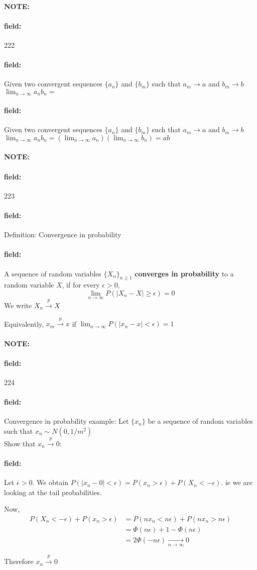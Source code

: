 \documentclass[12pt]{article}
\newenvironment{note}{\paragraph{NOTE:}}{}
\newenvironment{field}{\paragraph{field:}}{}
\begin{document}
\begin{note} \begin{field} \tiny 222 \end{field}
  \begin{field}
    Given two convergent sequences $\{a_n\}$ and $\{b_m\}$ such that $a_m \to a$ and $b_m \to b$\\
    $\lim_{n \to \infty} a_nb_n = $
  \end{field}
  \begin{field}
    Given two convergent sequences $\{a_n\}$ and $\{b_m\}$ such that $a_m \to a$ and $b_m \to b$\\
    $\lim_{n \to \infty} a_nb_n = (\lim_{n \to \infty}a_n)(\lim_{n \to \infty}b_n) = ab$
  \end{field}
\end{note}


\begin{note} \begin{field} \tiny 223 \end{field}
  \begin{field}
    Definition: Convergence in probability
  \end{field}
  \begin{field}
    A sequence of random variables $\{X_n\}_{n \geq 1}$ \textbf{converges in probability } to a random variable $X$, if for every $\epsilon > 0$, $$\lim_{n \to \infty}P(|X_n - X| \geq \epsilon) = 0 $$
    We write $X_n \overset{p}{\to} X$

    Equivalently, $x_m \overset{p}{\to} x$ if $\lim_{n \to \infty}P(|x_n - x| < \epsilon) = 1$
  \end{field}
\end{note}

\begin{note} \begin{field} \tiny 224 \end{field}
  \begin{field}
    Convergence in probability example:
    Let $\{x_n\}$ be a sequence of random variables such that $x_n \sim N(0,1/m^2)$\\
    Show that $x_n \overset{p}{\to} 0$:
  \end{field}
  \begin{field}
    Let $\epsilon > 0$. We obtain $P(|x_n - 0| < \epsilon) = P(x_n > \epsilon) + P(X_n < -\epsilon )$. ie we are looking at the tail probabilities.

    Now,
    \begin{align*}
      P(X_n < -\epsilon) + P(x_n > \epsilon) &=
      P(nx_n < n\epsilon) + P(nx_n > n\epsilon)\\
      &= \Phi(n\epsilon) + 1 - \Phi(n \epsilon)\\
      &= 2\Phi(-n\epsilon) \underset{n\to \infty}{\to}  0
    \end{align*}

    Therefore $x_n \overset{p}{\to} 0$
  \end{field}
\end{note}
\end{document}
